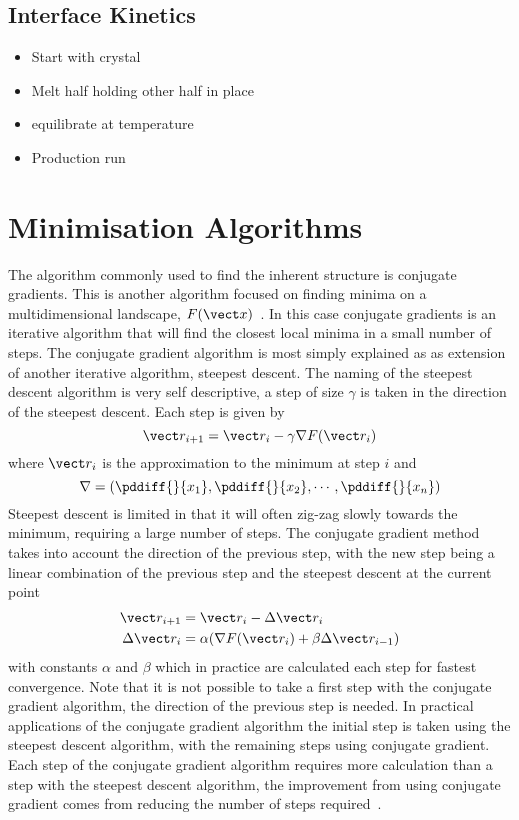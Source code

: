 \subsection{Interface Kinetics}

\begin{itemize}
    \item Start with crystal
    \item Melt half holding other half in place
    \item equilibrate at temperature
    \item Production run
\end{itemize}

\section{Minimisation Algorithms}

The algorithm commonly used to find the inherent structure is conjugate gradients\tocite. This is another algorithm focused on finding minima on a multidimensional landscape, $F(\vect x)$~\cite{shewchuk:94,hestenes:52}. In this case conjugate gradients is an iterative algorithm that will find the closest local minima in a small number of steps. The conjugate gradient algorithm is most simply explained as as extension of another iterative algorithm, steepest descent. The naming of the steepest descent algorithm is very self descriptive, a step of size $\gamma$ is taken in the direction of the steepest descent. Each step is given by
\begin{equation}
    \vect r_{i+1} = \vect r_i - \gamma \nabla F(\vect r_i)
\end{equation}
where $\vect r_i$ is the approximation to the minimum at step $i$ and
\begin{equation}
    \nabla = \left (\pddiff{}{x_1}, \pddiff{}{x_2},\cdots,\pddiff{}{x_n} \right )
\end{equation}
Steepest descent is limited in that it will often zig-zag slowly towards the minimum, requiring a large number of steps. The conjugate gradient method takes into account the direction of the previous step, with the new step being a linear combination of the previous step and the steepest descent at the current point
\begin{align}
    \vect r_{i+1} &= \vect r_{i} - \Delta \vect r_i \\
     \Delta \vect r_{i} &= \alpha( \nabla F(\vect r_i) + \beta \Delta \vect r_{i-1})
\end{align}
with constants $\alpha$ and $\beta$ which in practice are calculated each step for fastest convergence. Note that it is not possible to take a first step with the conjugate gradient algorithm, the direction of the previous step is needed. In practical applications of the conjugate gradient algorithm the initial step is taken using the steepest descent algorithm, with the remaining steps using conjugate gradient. Each step of the conjugate gradient algorithm requires more calculation than a step with the steepest descent algorithm, the improvement from using conjugate gradient comes from reducing the number of steps required~\cite{knyazev:08}.

